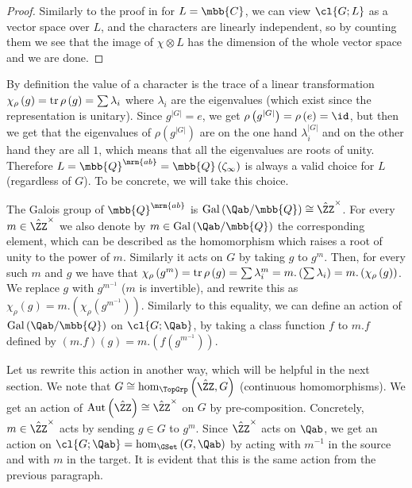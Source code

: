 \begin{proof}
	Similarly to the proof in \cite[9.1]{Ser} for $L = \mbb{C}$, we can view $\cl{G;L}$ as a vector space over $L$, and the characters are linearly independent, so by counting them we see that the image of $\chi \otimes L$ has the dimension of the whole vector space and we are done.
\end{proof}

By definition the value of a character is the trace of a linear transformation $\chi_\rho\left(g\right) = \operatorname{tr} \rho\left(g\right) = \sum \lambda_i$ where $\lambda_i$ are the eigenvalues (which exist since the representation is unitary).
Since $g^{\left|G\right|} = e$, we get $\rho\left(g^{\left|G\right|}\right) = \rho\left(e\right) = \id$, but then we get that the eigenvalues of $\rho\left(g^{\left|G\right|}\right)$ are on the one hand $\lambda_i^{\left|G\right|}$ and on the other hand they are all $1$, which means that all the eigenvalues are roots of unity.
Therefore $L = \mbb{Q}^\mrm{ab} = \mbb{Q}\left(\zeta_\infty\right)$ is always a valid choice for $L$ (regardless of $G$).
To be concrete, we will take this choice.

The Galois group of $\mbb{Q}^\mrm{ab}$ is $\Gal\left(\Qab / \mbb{Q}\right) \cong {\hat\ZZ}^\times$.
For every $m \in {\hat\ZZ}^\times$ we also denote by $m \in \Gal\left(\Qab / \mbb{Q}\right)$ the corresponding element, which can be described as the homomorphism which raises a root of unity to the power of $m$.
Similarly it acts on $G$ by taking $g$ to $g^m$.
Then, for every such $m$ and $g$ we have that
$
\chi_\rho\left(g^m\right)
= \operatorname{tr} \rho\left(g\right)
= \sum \lambda_i^m
= m. \left(\sum \lambda_i\right)
= m. \left(\chi_\rho\left(g\right)\right)
$.
We replace $g$ with $g^{m^{-1}}$ ($m$ is invertible), and rewrite this as $\chi_\rho\left(g\right) = m. \left(\chi_\rho\left(g^{m^{-1}}\right)\right)$.
Similarly to this equality, we can define an action of $\Gal\left(\Qab / \mbb{Q}\right)$ on $\cl{G; \Qab}$, by taking a class function $f$ to $m.f$ defined by $\left(m.f\right)\left(g\right) = m. \left(f\left(g^{m^{-1}}\right)\right)$.

Let us rewrite this action in another way, which will be helpful in the next section.
We note that $G \cong \hom_{\TopGrp}\left(\hat\ZZ, G\right)$ (continuous homomorphisms).
We get an action of $\aut\left(\hat\ZZ\right) \cong {\hat\ZZ}^\times$ on $G$ by pre-composition.
Concretely, $m \in {\hat\ZZ}^\times$ acts by sending $g \in G$ to $g^m$.
Since ${\hat\ZZ}^\times$ acts on $\Qab$, we get an action on $\cl{G; \Qab} = \hom_{\GSet}\left(G,  \Qab\right)$ by acting with $m^{-1}$ in the source and with $m$ in the target.
It is evident that this is the same action from the previous paragraph.

